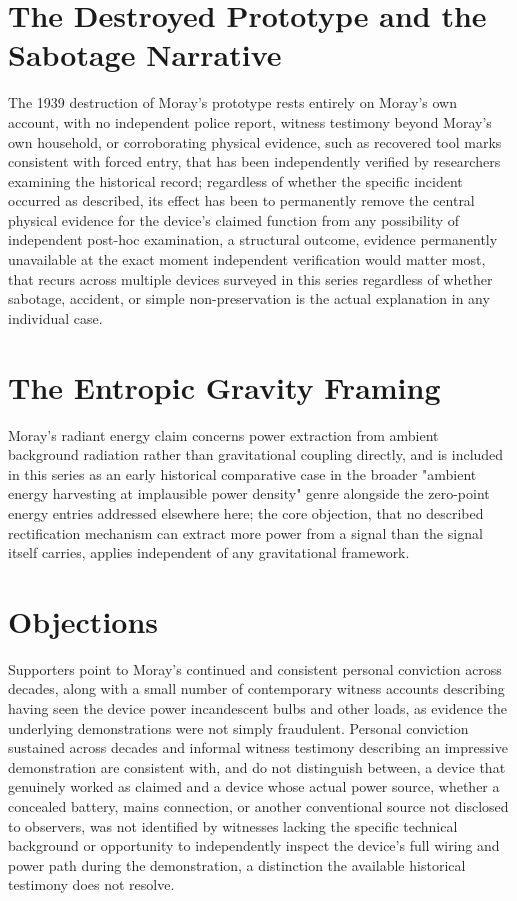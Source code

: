\documentclass[11pt]{article}
\begin{document}
\section{The Destroyed Prototype and the Sabotage Narrative}

The 1939 destruction of Moray's prototype rests entirely on Moray's own account, with no independent police report, witness testimony beyond Moray's own household, or corroborating physical evidence, such as recovered tool marks consistent with forced entry, that has been independently verified by researchers examining the historical record; regardless of whether the specific incident occurred as described, its effect has been to permanently remove the central physical evidence for the device's claimed function from any possibility of independent post-hoc examination, a structural outcome, evidence permanently unavailable at the exact moment independent verification would matter most, that recurs across multiple devices surveyed in this series regardless of whether sabotage, accident, or simple non-preservation is the actual explanation in any individual case.

\section{The Entropic Gravity Framing}

Moray's radiant energy claim concerns power extraction from ambient background radiation rather than gravitational coupling directly, and is included in this series as an early historical comparative case in the broader "ambient energy harvesting at implausible power density" genre alongside the zero-point energy entries addressed elsewhere here; the core objection, that no described rectification mechanism can extract more power from a signal than the signal itself carries, applies independent of any gravitational framework.

\section{Objections}

Supporters point to Moray's continued and consistent personal conviction across decades, along with a small number of contemporary witness accounts describing having seen the device power incandescent bulbs and other loads, as evidence the underlying demonstrations were not simply fraudulent. Personal conviction sustained across decades and informal witness testimony describing an impressive demonstration are consistent with, and do not distinguish between, a device that genuinely worked as claimed and a device whose actual power source, whether a concealed battery, mains connection, or another conventional source not disclosed to observers, was not identified by witnesses lacking the specific technical background or opportunity to independently inspect the device's full wiring and power path during the demonstration, a distinction the available historical testimony does not resolve.
\end{document}

